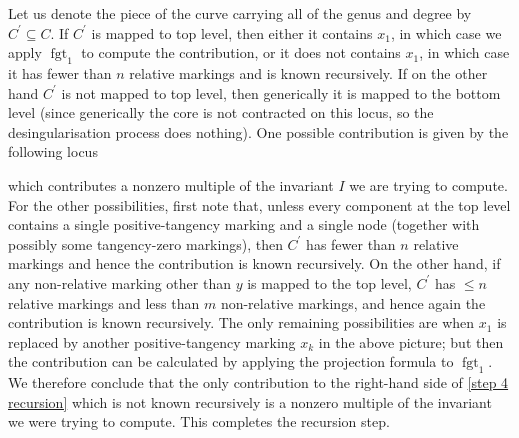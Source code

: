 \documentclass[11pt]{amsart}
\newcommand{\fgt}{\operatorname{fgt}}
\theoremstyle{definition}
\theoremstyle{definition}
\begin{document}
Let us denote the piece of the curve carrying all of the genus and degree by $C^\prime\subseteq C$. If $C^\prime$ is mapped to top level, then either it contains $x_1$, in which case we apply $\fgt_1$ to compute the contribution, or it does not contains $x_1$, in which case it has fewer than $n$ relative markings and is known recursively.  If on the other hand $C^\prime$ is not mapped to top level, then generically it is mapped to the bottom level (since generically the core is not contracted on this locus, so the desingularisation process does nothing). One possible contribution is given by the following locus
\begin{center}
\end{center}
which contributes a nonzero multiple of the invariant $I$ we are trying to compute. For the other possibilities, first note that, unless every component at the top level contains a single positive-tangency marking and a single node (together with possibly some tangency-zero markings), then $C^\prime$ has fewer than $n$ relative markings and hence the contribution is known recursively. On the other hand, if any non-relative marking other than $y$ is mapped to the top level, $C^\prime$ has $\leq n$ relative markings and less than $m$ non-relative markings, and hence again the contribution is known recursively. The only remaining possibilities are when $x_1$ is replaced by another positive-tangency marking $x_k$ in the above picture; but then the contribution can be calculated by applying the projection formula to $\fgt_{1}$. We therefore conclude that the only contribution to the right-hand side of \eqref{step 4 recursion} which is not known recursively is a nonzero multiple of the invariant we were trying to compute. This completes the recursion step.
\end{document}
